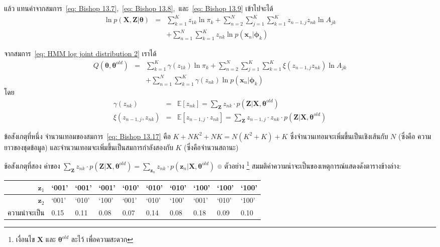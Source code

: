 แล้ว แทนค่าจากสมการ~\ref{eq: Bishop 13.7},~\ref{eq: Bishop 13.8},~และ~\ref{eq: Bishop 13.9} เข้าไปจะได้
\begin{eqnarray}
\ln p(\textbf{X}, \textbf{Z}|\bm{\theta})
&=&
\sum_{k=1}^K z_{1k} \ln \pi_k + \sum_{n=2}^N \sum_{j=1}^K \sum_{k=1}^K z_{n-1,j} z_{nk} \ln A_{jk} 
\nonumber \\
&\;&
+ \sum_{n=1}^{N} \sum_{k=1}^K z_{nk} \ln p(\textbf{x}_n|\bm{\phi}_k)
\label{eq: HMM log joint distribution 2}
\end{eqnarray}

จากสมการ~\ref{eq: HMM log joint distribution 2} เราได้
\begin{eqnarray}
Q(\bm{\theta}, \bm{\theta}^{old})
&=&
\sum_{k=1}^K \gamma (z_{1k}) \ln \pi_k + \sum_{n=2}^N \sum_{j=1}^K \sum_{k=1}^K \xi (z_{n-1,j} z_{nk}) \ln A_{jk} 
\nonumber \\
&\;&
+ \sum_{n=1}^{N} \sum_{k=1}^K \gamma (z_{nk}) \ln p(\textbf{x}_n|\bm{\phi}_k)
\label{eq: Bishop 13.17}
\end{eqnarray}
โดย 
\begin{eqnarray}
\gamma ( z_{nk} ) &=& \mathbb{E}[z_{nk}] = \sum_{\textbf{Z}} z_{nk} \cdot p(\textbf{Z}| \textbf{X}, \bm{\theta}^{old})
\label{eq: Bishop 13.15a}
\\
\xi (z_{n-1,j}, z_{nk}) &=& \mathbb{E}[z_{n-1,j} \cdot z_{nk}] = \sum_{\textbf{Z}} z_{n-1,j} \cdot z_{nk} \cdot p(\textbf{Z}| \textbf{X}, \bm{\theta}^{old})
\label{eq: Bishop 13.16a}
\end{eqnarray}

ข้อสังเกตุที่หนึ่ง จำนวนเทอมของสมการ~\ref{eq: Bishop 13.17} คือ $K + N K^2 + N K = N (K^2 + K) + K$ ซึ่งจำนวนเทอมจะเพิ่มขึ้นเป็นเชิงเส้นกับ $N$ (ซึ่งคือ ความยาวของชุดข้อมูล)
และจำนวนเทอมจะเพิ่มขึ้นเป็นสมการกำลังสองกับ $K$ (ซึ่งคือจำนวนสถานะ)

ข้อสังเกตุที่สอง ค่าของ $\sum_{\textbf{Z}} z_{nk} \cdot p(\textbf{Z}| \textbf{X}, \bm{\theta}^{old}) = \sum_{\textbf{z}_n} z_{nk} \cdot p(\textbf{z}_n| \textbf{X}, \bm{\theta}^{old})$ 
๏ ตัวอย่าง%
\footnote{เงื่อนไข $\textbf{X}$ และ $\bm{\theta}^{old}$ ละไว้ เพื่อความสะดวก} 
สมมติค่าความน่าจะเป็นของเหตุการณ์แสดงดังตารางข้างล่าง:

\begin{tabular}{|r|l|l|l|l|l|l|l|l|l|}
\hline
$\textbf{z}_1$ & 
`001' & `001' & `001' &
`010' & `010' & `010' &
`100' & `100' & `100' \\
\hline
$\textbf{z}_2$ & 
`001' & `010' & `100' &
`001' & `010' & `100' &
`001' & `010' & `100' \\
\hline
ความน่าจะเป็น & 
0.15 & 0.11 & 0.08 &
0.07 & 0.14 & 0.08 &
0.18 & 0.09 & 0.10 \\
\hline
\end{tabular}

